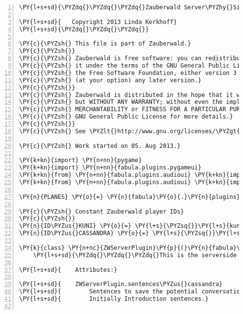 \begin{Verbatim}[commandchars=\\\{\},numbers=left,firstnumber=1,stepnumber=1]
\PY{l+s+sd}{\PYZdq{}\PYZdq{}\PYZdq{}Zauberwald Server\PYZhy{}Side Plugin for Fabula}

\PY{l+s+sd}{   Copyright 2013 Linda Kerkhoff}
\PY{l+s+sd}{\PYZdq{}\PYZdq{}\PYZdq{}}

\PY{c}{\PYZsh{} This file is part of Zauberwald.}
\PY{c}{\PYZsh{}}
\PY{c}{\PYZsh{} Zauberwald is free software: you can redistribute it and/or modify}
\PY{c}{\PYZsh{} it under the terms of the GNU General Public License as published by}
\PY{c}{\PYZsh{} the Free Software Foundation, either version 3 of the License, or}
\PY{c}{\PYZsh{} (at your option) any later version.}
\PY{c}{\PYZsh{}}
\PY{c}{\PYZsh{} Zauberwald is distributed in the hope that it will be useful,}
\PY{c}{\PYZsh{} but WITHOUT ANY WARRANTY; without even the implied warranty of}
\PY{c}{\PYZsh{} MERCHANTABILITY or FITNESS FOR A PARTICULAR PURPOSE.  See the}
\PY{c}{\PYZsh{} GNU General Public License for more details.}
\PY{c}{\PYZsh{}}
\PY{c}{\PYZsh{} See \PYZlt{}http://www.gnu.org/licenses/\PYZgt{}.}

\PY{c}{\PYZsh{} Work started on 05. Aug 2013.}

\PY{k+kn}{import} \PY{n+nn}{pygame}
\PY{k+kn}{import} \PY{n+nn}{fabula.plugins.pygameui}
\PY{k+kn}{from} \PY{n+nn}{fabula.plugins.audioui} \PY{k+kn}{import} \PY{n}{AudioTextField}
\PY{k+kn}{from} \PY{n+nn}{fabula.plugins.audioui} \PY{k+kn}{import} \PY{n}{TextMenuList}

\PY{n}{PLANES} \PY{o}{=} \PY{n}{fabula}\PY{o}{.}\PY{n}{plugins}\PY{o}{.}\PY{n}{pygameui}\PY{o}{.}\PY{n}{planes}

\PY{c}{\PYZsh{} Constant Zauberwald player IDs}
\PY{c}{\PYZsh{}}
\PY{n}{ID\PYZus{}KUNI} \PY{o}{=} \PY{l+s}{\PYZsq{}}\PY{l+s}{kuni}\PY{l+s}{\PYZsq{}}
\PY{n}{ID\PYZus{}CASSANDRA} \PY{o}{=} \PY{l+s}{\PYZsq{}}\PY{l+s}{cassandra}\PY{l+s}{\PYZsq{}}

\PY{k}{class} \PY{n+nc}{ZWServerPlugin}\PY{p}{(}\PY{n}{fabula}\PY{o}{.}\PY{n}{plugins}\PY{o}{.}\PY{n}{serverside}\PY{o}{.}\PY{n}{DefaultGame}\PY{p}{)}\PY{p}{:}
    \PY{l+s+sd}{\PYZdq{}\PYZdq{}\PYZdq{}This is the serverside Plugin for the Zauberwald game.}

\PY{l+s+sd}{    Attributes:}

\PY{l+s+sd}{    ZWServerPlugin.sentences\PYZus{}cassandra}
\PY{l+s+sd}{        Sentences to save the potential conversation possibilities with Kuni.}
\PY{l+s+sd}{        Initially Introduction sentences.}


\end{Verbatim}
